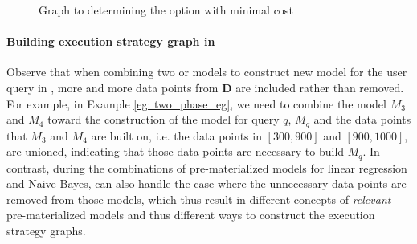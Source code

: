 \begin{example}
\begin{figure}[t]
\begin{center}
\end{center}
\caption{Graph to determining the option with minimal cost}
\label{fig:min_cost_graph}
\end{figure}

\end{example}

\paragraph{Building execution strategy graph in \cite{gupta2015processing}} Observe that when combining two or models to construct new model for the user query in \cite{hasani2018efficient}, more and more data points from $\textbf{D}$ are included rather than removed. For example, in Example \ref{eg: two_phase_eg}, we need to combine the model $M_3$ and $M_4$ toward the construction of the model for query $q$, $M_q$ and the data points that $M_3$ and $M_4$ are built on, i.e. the data points in $[300, 900]$ and $[900, 1000]$, are unioned, indicating that those data points are necessary to build $M_q$.  In contrast, during the combinations of pre-materialized models for linear regression and Naive Bayes, \cite{gupta2015processing} can also handle the case where the unnecessary data points are removed from those models, which thus result in different concepts of {\em relevant} pre-materialized models and thus different ways to construct the execution strategy graphs.

